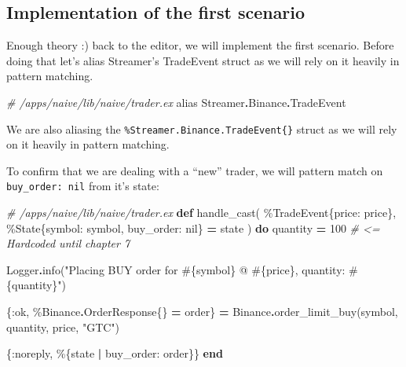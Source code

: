 \documentclass[
]{book}
\newenvironment{Shaded}{\begin{snugshade}}{\end{snugshade}}
\newcommand{\CommentTok}[1]{\textcolor[rgb]{0.56,0.35,0.01}{\textit{#1}}}
\newcommand{\ConstantTok}[1]{\textcolor[rgb]{0.00,0.00,0.00}{#1}}
\newcommand{\DecValTok}[1]{\textcolor[rgb]{0.00,0.00,0.81}{#1}}
\newcommand{\ImportTok}[1]{#1}
\newcommand{\KeywordTok}[1]{\textcolor[rgb]{0.13,0.29,0.53}{\textbf{#1}}}
\newcommand{\NormalTok}[1]{#1}
\newcommand{\OperatorTok}[1]{\textcolor[rgb]{0.81,0.36,0.00}{\textbf{#1}}}
\newcommand{\OtherTok}[1]{\textcolor[rgb]{0.56,0.35,0.01}{#1}}
\newcommand{\StringTok}[1]{\textcolor[rgb]{0.31,0.60,0.02}{#1}}
\newcommand{\VariableTok}[1]{\textcolor[rgb]{0.00,0.00,0.00}{#1}}
\begin{document}
\hypertarget{implementation-of-the-first-scenario}{%
\subsection{Implementation of the first scenario}\label{implementation-of-the-first-scenario}}

Enough theory :) back to the editor, we will implement the first scenario. Before doing that let's alias Streamer's TradeEvent struct as we will rely on it heavily in pattern matching.

\begin{Shaded}
\begin{Highlighting}[]
  \CommentTok{\# /apps/naive/lib/naive/trader.ex}
  \ImportTok{alias} \ConstantTok{Streamer}\OperatorTok{.}\ConstantTok{Binance}\OperatorTok{.}\ConstantTok{TradeEvent}
\end{Highlighting}
\end{Shaded}

We are also aliasing the \texttt{\%Streamer.Binance.TradeEvent\{\}} struct as we will rely on it heavily in pattern matching.

To confirm that we are dealing with a ``new'' trader, we will pattern match on \texttt{buy\_order:\ nil} from it's state:

\begin{Shaded}
\begin{Highlighting}[]
  \CommentTok{\# /apps/naive/lib/naive/trader.ex}
  \KeywordTok{def}\NormalTok{ handle\_cast(}
\NormalTok{        \%}\ConstantTok{TradeEvent}\NormalTok{\{}\VariableTok{price:}\NormalTok{ price\},}
\NormalTok{        \%}\ConstantTok{State}\NormalTok{\{}\VariableTok{symbol:}\NormalTok{ symbol, }\VariableTok{buy\_order:} \ConstantTok{nil}\NormalTok{\} }\OperatorTok{=}\NormalTok{ state}
\NormalTok{      ) }\KeywordTok{do}
\NormalTok{    quantity }\OperatorTok{=} \DecValTok{100} \CommentTok{\# \textless{}= Hardcoded until chapter 7}

    \ConstantTok{Logger}\OperatorTok{.}\NormalTok{info(}\StringTok{"Placing BUY order for }\OtherTok{\#\{}\NormalTok{symbol}\OtherTok{\}}\StringTok{ @ }\OtherTok{\#\{}\NormalTok{price}\OtherTok{\}}\StringTok{, quantity: }\OtherTok{\#\{}\NormalTok{quantity}\OtherTok{\}}\StringTok{"}\NormalTok{)}

\NormalTok{    \{}\VariableTok{:ok}\NormalTok{, \%}\ConstantTok{Binance}\OperatorTok{.}\ConstantTok{OrderResponse}\NormalTok{\{\} }\OperatorTok{=}\NormalTok{ order\} }\OperatorTok{=}
      \ConstantTok{Binance}\OperatorTok{.}\NormalTok{order\_limit\_buy(symbol, quantity, price, }\StringTok{"GTC"}\NormalTok{)}

\NormalTok{    \{}\VariableTok{:noreply}\NormalTok{, \%\{state }\OperatorTok{|} \VariableTok{buy\_order:}\NormalTok{ order\}\}}
  \KeywordTok{end}
\end{Highlighting}
\end{Shaded}
\end{document}
